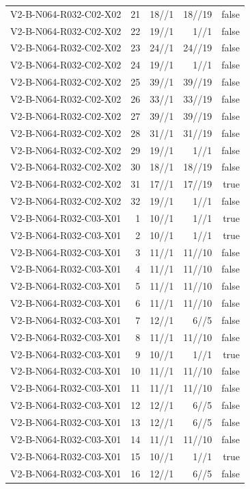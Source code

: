 {\begin{longtable}{lrrrr}
V2-B-N064-R032-C02-X02 & 21 & 18//1 & 18//19 & false \\
V2-B-N064-R032-C02-X02 & 22 & 19//1 & 1//1 & false \\
V2-B-N064-R032-C02-X02 & 23 & 24//1 & 24//19 & false \\
V2-B-N064-R032-C02-X02 & 24 & 19//1 & 1//1 & false \\
V2-B-N064-R032-C02-X02 & 25 & 39//1 & 39//19 & false \\
V2-B-N064-R032-C02-X02 & 26 & 33//1 & 33//19 & false \\
V2-B-N064-R032-C02-X02 & 27 & 39//1 & 39//19 & false \\
V2-B-N064-R032-C02-X02 & 28 & 31//1 & 31//19 & false \\
V2-B-N064-R032-C02-X02 & 29 & 19//1 & 1//1 & false \\
V2-B-N064-R032-C02-X02 & 30 & 18//1 & 18//19 & false \\
V2-B-N064-R032-C02-X02 & 31 & 17//1 & 17//19 & true \\
V2-B-N064-R032-C02-X02 & 32 & 19//1 & 1//1 & false \\
V2-B-N064-R032-C03-X01 & 1 & 10//1 & 1//1 & true \\
V2-B-N064-R032-C03-X01 & 2 & 10//1 & 1//1 & true \\
V2-B-N064-R032-C03-X01 & 3 & 11//1 & 11//10 & false \\
V2-B-N064-R032-C03-X01 & 4 & 11//1 & 11//10 & false \\
V2-B-N064-R032-C03-X01 & 5 & 11//1 & 11//10 & false \\
V2-B-N064-R032-C03-X01 & 6 & 11//1 & 11//10 & false \\
V2-B-N064-R032-C03-X01 & 7 & 12//1 & 6//5 & false \\
V2-B-N064-R032-C03-X01 & 8 & 11//1 & 11//10 & false \\
V2-B-N064-R032-C03-X01 & 9 & 10//1 & 1//1 & true \\
V2-B-N064-R032-C03-X01 & 10 & 11//1 & 11//10 & false \\
V2-B-N064-R032-C03-X01 & 11 & 11//1 & 11//10 & false \\
V2-B-N064-R032-C03-X01 & 12 & 12//1 & 6//5 & false \\
V2-B-N064-R032-C03-X01 & 13 & 12//1 & 6//5 & false \\
V2-B-N064-R032-C03-X01 & 14 & 11//1 & 11//10 & false \\
V2-B-N064-R032-C03-X01 & 15 & 10//1 & 1//1 & true \\
V2-B-N064-R032-C03-X01 & 16 & 12//1 & 6//5 & false \\

\end{longtable}}
